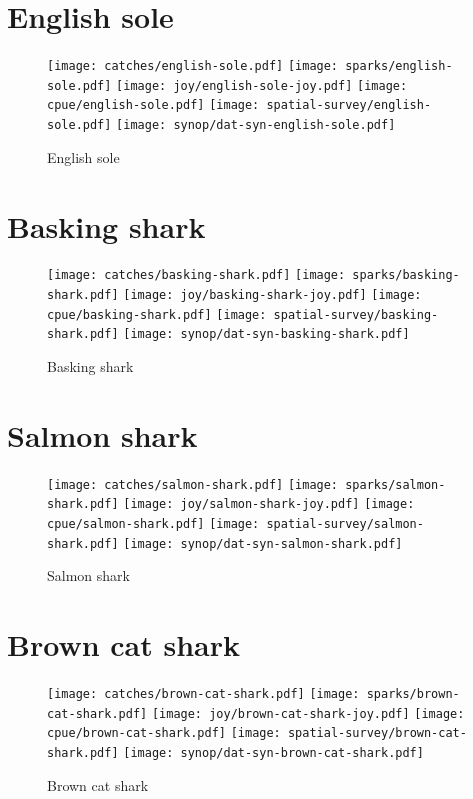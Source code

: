 \section*{English sole}

\begin{figure}[htbp]
\centering
\texttt{[image: catches/english-sole.pdf]}
\texttt{[image: sparks/english-sole.pdf]}
\texttt{[image: joy/english-sole-joy.pdf]}
\texttt{[image: cpue/english-sole.pdf]}
\texttt{[image: spatial-survey/english-sole.pdf]}
\texttt{[image: synop/dat-syn-english-sole.pdf]}
\caption{English sole}
\end{figure}
\clearpage
\section*{Basking shark}

\begin{figure}[htbp]
\centering
\texttt{[image: catches/basking-shark.pdf]}
\texttt{[image: sparks/basking-shark.pdf]}
\texttt{[image: joy/basking-shark-joy.pdf]}
\texttt{[image: cpue/basking-shark.pdf]}
\texttt{[image: spatial-survey/basking-shark.pdf]}
\texttt{[image: synop/dat-syn-basking-shark.pdf]}
\caption{Basking shark}
\end{figure}
\clearpage
\section*{Salmon shark}

\begin{figure}[htbp]
\centering
\texttt{[image: catches/salmon-shark.pdf]}
\texttt{[image: sparks/salmon-shark.pdf]}
\texttt{[image: joy/salmon-shark-joy.pdf]}
\texttt{[image: cpue/salmon-shark.pdf]}
\texttt{[image: spatial-survey/salmon-shark.pdf]}
\texttt{[image: synop/dat-syn-salmon-shark.pdf]}
\caption{Salmon shark}
\end{figure}
\clearpage
\section*{Brown cat shark}

\begin{figure}[htbp]
\centering
\texttt{[image: catches/brown-cat-shark.pdf]}
\texttt{[image: sparks/brown-cat-shark.pdf]}
\texttt{[image: joy/brown-cat-shark-joy.pdf]}
\texttt{[image: cpue/brown-cat-shark.pdf]}
\texttt{[image: spatial-survey/brown-cat-shark.pdf]}
\texttt{[image: synop/dat-syn-brown-cat-shark.pdf]}
\caption{Brown cat shark}
\end{figure}
\clearpage

